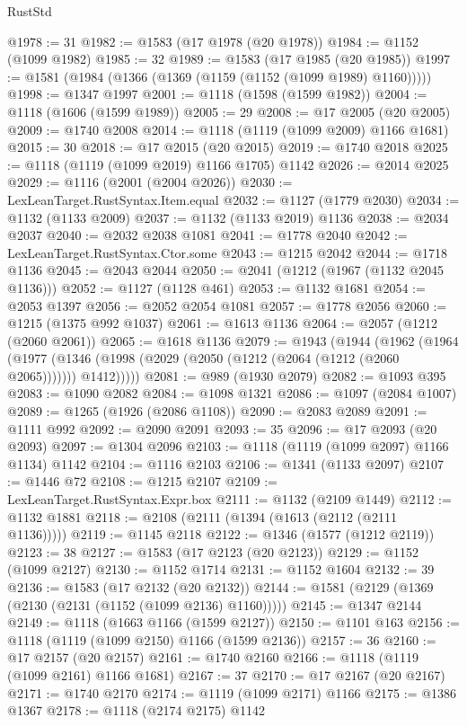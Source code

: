 \begin{lexlean}{RustStd}
\begin{coremodule}
@1978 := 31
@1982 := @1583 (@17 @1978 (@20 @1978))
@1984 := @1152 (@1099 @1982)
@1985 := 32
@1989 := @1583 (@17 @1985 (@20 @1985))
@1997 := @1581 (@1984 (@1366 (@1369 (@1159 (@1152 (@1099 @1989) @1160)))))
@1998 := @1347 @1997
@2001 := @1118 (@1598 (@1599 @1982))
@2004 := @1118 (@1606 (@1599 @1989))
@2005 := 29
@2008 := @17 @2005 (@20 @2005)
@2009 := @1740 @2008
@2014 := @1118 (@1119 (@1099 @2009) @1166 @1681)
@2015 := 30
@2018 := @17 @2015 (@20 @2015)
@2019 := @1740 @2018
@2025 := @1118 (@1119 (@1099 @2019) @1166 @1705) @1142
@2026 := @2014 @2025
@2029 := @1116 (@2001 (@2004 @2026))
@2030 := LexLeanTarget.RustSyntax.Item.equal
@2032 := @1127 (@1779 @2030)
@2034 := @1132 (@1133 @2009)
@2037 := @1132 (@1133 @2019) @1136
@2038 := @2034 @2037
@2040 := @2032 @2038 @1081
@2041 := @1778 @2040
@2042 := LexLeanTarget.RustSyntax.Ctor.some
@2043 := @1215 @2042
@2044 := @1718 @1136
@2045 := @2043 @2044
@2050 := @2041 (@1212 (@1967 (@1132 @2045 @1136)))
@2052 := @1127 (@1128 @461)
@2053 := @1132 @1681
@2054 := @2053 @1397
@2056 := @2052 @2054 @1081
@2057 := @1778 @2056
@2060 := @1215 (@1375 @992 @1037)
@2061 := @1613 @1136
@2064 := @2057 (@1212 (@2060 @2061))
@2065 := @1618 @1136
@2079 := @1943
    (@1944
      (@1962
        (@1964
          (@1977 (@1346 (@1998 (@2029 (@2050 (@1212 (@2064 (@1212 (@2060 @2065))))))) @1412)))))
@2081 := @989 (@1930 @2079)
@2082 := @1093 @395
@2083 := @1090 @2082
@2084 := @1098 @1321
@2086 := @1097 (@2084 @1007)
@2089 := @1265 (@1926 (@2086 @1108))
@2090 := @2083 @2089
@2091 := @1111 @992
@2092 := @2090 @2091
@2093 := 35
@2096 := @17 @2093 (@20 @2093)
@2097 := @1304 @2096
@2103 := @1118 (@1119 (@1099 @2097) @1166 @1134) @1142
@2104 := @1116 @2103
@2106 := @1341 (@1133 @2097)
@2107 := @1446 @72
@2108 := @1215 @2107
@2109 := LexLeanTarget.RustSyntax.Expr.box
@2111 := @1132 (@2109 @1449)
@2112 := @1132 @1881
@2118 := @2108 (@2111 (@1394 (@1613 (@2112 (@2111 @1136)))))
@2119 := @1145 @2118
@2122 := @1346 (@1577 (@1212 @2119))
@2123 := 38
@2127 := @1583 (@17 @2123 (@20 @2123))
@2129 := @1152 (@1099 @2127)
@2130 := @1152 @1714
@2131 := @1152 @1604
@2132 := 39
@2136 := @1583 (@17 @2132 (@20 @2132))
@2144 := @1581 (@2129 (@1369 (@2130 (@2131 (@1152 (@1099 @2136) @1160)))))
@2145 := @1347 @2144
@2149 := @1118 (@1663 @1166 (@1599 @2127))
@2150 := @1101 @163
@2156 := @1118 (@1119 (@1099 @2150) @1166 (@1599 @2136))
@2157 := 36
@2160 := @17 @2157 (@20 @2157)
@2161 := @1740 @2160
@2166 := @1118 (@1119 (@1099 @2161) @1166 @1681)
@2167 := 37
@2170 := @17 @2167 (@20 @2167)
@2171 := @1740 @2170
@2174 := @1119 (@1099 @2171) @1166
@2175 := @1386 @1367
@2178 := @1118 (@2174 @2175) @1142

\end{coremodule}
\end{lexlean}
